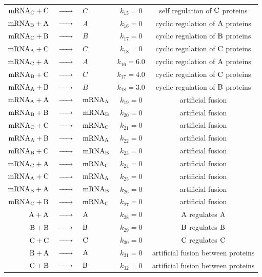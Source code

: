 \documentclass[oneside, abstracton, titlepage]{scrartcl}
\begin{document}
\begin{table}[h]
{\begin{tabular}{rclcc}
				$\ce{mRNA_C + C}$ &$\ce{->}$& $C$ & $k_{15} = 0$ & self regulation of $\ce{C}$ proteins\\
				$\ce{mRNA_B + A}$ &$\ce{->}$& $A$ & $k_{16} = 0$ & cyclic regulation of $\ce{A}$ proteins\\
				$\ce{mRNA_C + B}$ &$\ce{->}$& $B$ & $k_{17} = 0$ & cyclic regulation of $\ce{B}$ proteins\\
				$\ce{mRNA_A + C}$ &$\ce{->}$& $C$ & $k_{18} = 0$ & cyclic regulation of $\ce{C}$ proteins\\
				$\ce{mRNA_C + A}$ &$\ce{->}$& $A$ & $k_{16} = 6.0$ & cyclic regulation of $\ce{A}$ proteins\\
				$\ce{mRNA_B + C}$ &$\ce{->}$& $C$ & $k_{17} = 4.0$ & cyclic regulation of $\ce{C}$ proteins\\
				$\ce{mRNA_A + B}$ &$\ce{->}$& $B$ & $k_{18} = 3.0$ & cyclic regulation of $\ce{B}$ proteins\\
				$\ce{mRNA_A + A}$ &$\ce{->}$& $\ce{mRNA_A}$ & $k_{19} = 0$ & artificial fusion\\
				$\ce{mRNA_B + B}$ &$\ce{->}$& $\ce{mRNA_B}$ & $k_{20} = 0$ & artificial fusion\\
				$\ce{mRNA_C + C}$ &$\ce{->}$& $\ce{mRNA_C}$ & $k_{21} = 0$ & artificial fusion\\
				$\ce{mRNA_A + B}$ &$\ce{->}$& $\ce{mRNA_A}$ & $k_{22} = 0$ & artificial fusion\\
				$\ce{mRNA_B + C}$ &$\ce{->}$& $\ce{mRNA_B}$ & $k_{23} = 0$ & artificial fusion\\
				$\ce{mRNA_C + A}$ &$\ce{->}$& $\ce{mRNA_C}$ & $k_{24} = 0$ & artificial fusion\\
				$\ce{mRNA_A + C}$ &$\ce{->}$& $\ce{mRNA_A}$ & $k_{25} = 0$ & artificial fusion\\
				$\ce{mRNA_B + A}$ &$\ce{->}$& $\ce{mRNA_B}$ & $k_{26} = 0$ & artificial fusion\\
				$\ce{mRNA_C + B}$ &$\ce{->}$& $\ce{mRNA_C}$ & $k_{27} = 0$ & artificial fusion\\
				$\ce{A + A}$ &$\ce{->}$& $\ce{A}$ & $k_{28} = 0$ & $\ce{A}$ regulates $\ce{A}$\\
				$\ce{B + B}$ &$\ce{->}$& $\ce{B}$ & $k_{29} = 0$ & $\ce{B}$ regulates $\ce{B}$\\
				$\ce{C + C}$ &$\ce{->}$& $\ce{C}$ & $k_{30} = 0$ & $\ce{C}$ regulates $\ce{C}$\\
				$\ce{B + A}$ &$\ce{->}$& $\ce{A}$ & $k_{31} = 0$ & artificial fusion between proteins\\
				$\ce{C + B}$ &$\ce{->}$& $\ce{B}$ & $k_{32} = 0$ & artificial fusion between proteins\\

\end{tabular}}
\end{table}
\end{document}

